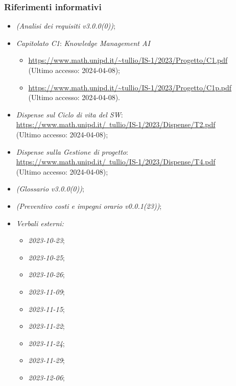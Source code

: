 \documentclass[10pt, a4paper]{article}
\begin{document}
\subsubsection{Riferimenti informativi}
\begin{itemize}
    \item \textit{(Analisi dei requisiti v3.0.0(0))};
    \item \textit{Capitolato C1}: \textit{Knowledge Management AI}
    \begin{itemize}
        \item \url{https://www.math.unipd.it/~tullio/IS-1/2023/Progetto/C1.pdf}\\
        (Ultimo accesso: 2024-04-08);
        \item \url{https://www.math.unipd.it/~tullio/IS-1/2023/Progetto/C1p.pdf}\\
        (Ultimo accesso: 2024-04-08).
    \end{itemize}
    \item \textit{Dispense sul Ciclo di vita del SW\pg}:\\
    \href{https://www.math.unipd.it/~tullio/IS-1/2023/Dispense/T2.pdf}{https://www.math.unipd.it/~tullio/IS-1/2023/Dispense/T2.pdf}\\
    (Ultimo accesso: 2024-04-08);
    \item  \textit{Dispense sulla Gestione di progetto}:\\
    \href{https://www.math.unipd.it/~tullio/IS-1/2023/Dispense/T4.pdf}{https://www.math.unipd.it/~tullio/IS-1/2023/Dispense/T4.pdf}\\
    (Ultimo accesso: 2024-04-08);
    \item \textit{(Glossario v3.0.0(0))};
    \item \textit{(Preventivo costi e impegni orario v0.0.1(23))};
    \item \textit{Verbali esterni:}
    \begin{itemize}
        \item \textit{2023-10-23};
        \item \textit{2023-10-25};
        \item \textit{2023-10-26};
        \item \textit{2023-11-09};
        \item \textit{2023-11-15};
        \item \textit{2023-11-22};
        \item \textit{2023-11-24};
        \item \textit{2023-11-29};
        \item \textit{2023-12-06};

\end{itemize}
\end{itemize}
\end{document}
